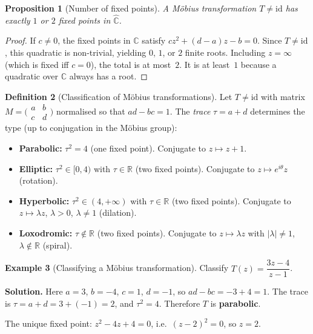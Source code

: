 \documentclass[12pt,a4paper,openany]{book}
\theoremstyle{definition}
\newtheorem{definition}{Definition}[chapter]
\newtheorem{example}[definition]{Example}
\theoremstyle{plain}
\newtheorem{proposition}[definition]{Proposition}
\theoremstyle{remark}
\newcommand{\C}{\mathbb{C}}
\newcommand{\R}{\mathbb{R}}
\newcommand{\abs}[1]{\left|#1\right|}
\begin{document}
\begin{proposition}[Number of fixed points]\label{prop:fixed-pts-count}
A M\"obius transformation $T\neq\mathrm{id}$ has exactly $1$ or $2$
fixed points in $\hat{\C}$.
\end{proposition}

\begin{proof}
If $c\neq 0$, the fixed points in $\C$ satisfy $cz^2+(d-a)z-b=0$.
Since $T\neq\mathrm{id}$, this quadratic is non-trivial, yielding
$0$, $1$, or $2$ finite roots.  Including $z=\infty$ (which is fixed
iff $c=0$), the total is at most~$2$.  It is at least~$1$ because a
quadratic over $\C$ always has a root.
\end{proof}

\begin{definition}[Classification of M\"obius transformations]\label{def:mobius-class}
Let $T\neq\mathrm{id}$ with matrix $M=\bigl(\begin{smallmatrix}a&b\\c&d
\end{smallmatrix}\bigr)$ normalised so that $ad-bc=1$.  The \emph{trace}
$\tau=a+d$ determines the type (up to conjugation in the M\"obius group):
\begin{itemize}
  \item \textbf{Parabolic:} $\tau^2=4$ (one fixed point).
        Conjugate to $z\mapsto z+1$.
  \item \textbf{Elliptic:} $\tau^2\in[0,4)$ with $\tau\in\R$
        (two fixed points).  Conjugate to $z\mapsto e^{i\theta}z$ (rotation).
  \item \textbf{Hyperbolic:} $\tau^2\in(4,+\infty)$ with $\tau\in\R$
        (two fixed points).  Conjugate to $z\mapsto\lambda z$, $\lambda>0$,
        $\lambda\neq 1$ (dilation).
  \item \textbf{Loxodromic:} $\tau\notin\R$ (two fixed points).
        Conjugate to $z\mapsto\lambda z$ with $\abs{\lambda}\neq 1$,
        $\lambda\notin\R$ (spiral).
\end{itemize}
\end{definition}

\begin{example}[Classifying a M\"obius transformation]\label{ex:mobius-classify}
Classify $T(z)=\dfrac{3z-4}{z-1}$.

\medskip\noindent\textbf{Solution.}
Here $a=3$, $b=-4$, $c=1$, $d=-1$, so $ad-bc=-3+4=1$.  The trace is
$\tau=a+d=3+(-1)=2$, and $\tau^2=4$.  Therefore $T$ is \textbf{parabolic}.

The unique fixed point: $z^2-4z+4=0$, i.e.\ $(z-2)^2=0$, so $z=2$.
\end{example}
\end{document}
